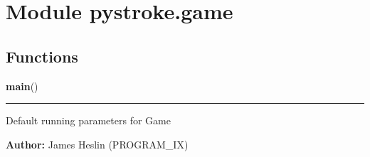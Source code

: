%
%
%


\section{Module pystroke.game}

    \label{pystroke:game}


  \subsection{Functions}

    \label{pystroke:game:main}

    \vspace{0.5ex}

\hspace{.8\funcindent}\begin{boxedminipage}{\funcwidth}

    \raggedright \textbf{main}()

    \vspace{-1.5ex}

    \rule{\textwidth}{0.5\fboxrule}
\setlength{\parskip}{2ex}
    Default running parameters for Game

\setlength{\parskip}{1ex}
\textbf{Author:} James Heslin (PROGRAM\_IX)



    \end{boxedminipage}



